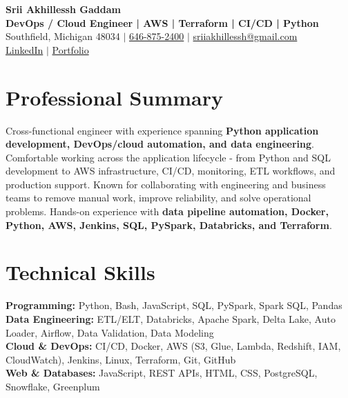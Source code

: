 \documentclass[letterpaper,10pt]{article}
\begin{document}
\fontsize{9.35pt}{10.45pt}\selectfont

\begin{center}
    {\LARGE \textbf{Srii Akhillessh Gaddam}} \\[-1pt]
    \textbf{DevOps / Cloud Engineer | AWS | Terraform | CI/CD | Python} \\[2pt]
    Southfield, Michigan 48034 $|$
    \href{tel:6468752400}{646-875-2400} $|$
    \href{mailto:sriiakhillessh@gmail.com}{sriiakhillessh@gmail.com} \\[1pt]
    \href{https://www.linkedin.com/in/srii-akhiilessh-gaddam-b48668191/}{LinkedIn} $|$
    \href{https://sriiakhillesshg.github.io/portfolio/}{Portfolio}
\end{center}
\vspace{-8pt}

\section{Professional Summary}
\small{Cross-functional engineer with experience spanning \textbf{Python application development, DevOps/cloud automation, and data engineering}. Comfortable working across the application lifecycle - from Python and SQL development to AWS infrastructure, CI/CD, monitoring, ETL workflows, and production support. Known for collaborating with engineering and business teams to remove manual work, improve reliability, and solve operational problems. Hands-on experience with \textbf{data pipeline automation, Docker, Python, AWS, Jenkins, SQL, PySpark, Databricks, and Terraform}.}

\section{Technical Skills}
\small{
\textbf{Programming:} Python, Bash, JavaScript, SQL, PySpark, Spark SQL, Pandas \\
\textbf{Data Engineering:} ETL/ELT, Databricks, Apache Spark, Delta Lake, Auto Loader, Airflow, Data Validation, Data Modeling \\
\textbf{Cloud \& DevOps:} CI/CD, Docker, AWS (S3, Glue, Lambda, Redshift, IAM, CloudWatch), Jenkins, Linux, Terraform, Git, GitHub \\
\textbf{Web \& Databases:} JavaScript, REST APIs, HTML, CSS, PostgreSQL, Snowflake, Greenplum
}
\end{document}
